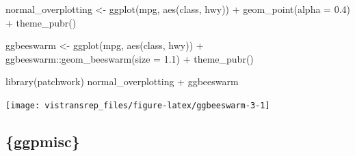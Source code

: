 \documentclass[]{book}
\newenvironment{Shaded}{}{}
\newcommand{\DataTypeTok}[1]{#1}
\newcommand{\FloatTok}[1]{#1}
\newcommand{\KeywordTok}[1]{\textcolor[rgb]{0.00,0.00,1.00}{#1}}
\newcommand{\NormalTok}[1]{#1}
\newcommand{\OperatorTok}[1]{#1}
\newcommand{\StringTok}[1]{\textcolor[rgb]{0.00,0.50,0.50}{#1}}
\begin{document}
\begin{Shaded}
\begin{Highlighting}[]
\NormalTok{normal_overplotting <-}\StringTok{ }\KeywordTok{ggplot}\NormalTok{(mpg, }\KeywordTok{aes}\NormalTok{(class, hwy)) }\OperatorTok{+}
\StringTok{  }\KeywordTok{geom_point}\NormalTok{(}\DataTypeTok{alpha =} \FloatTok{0.4}\NormalTok{) }\OperatorTok{+}
\StringTok{  }\KeywordTok{theme_pubr}\NormalTok{()}
\end{Highlighting}
\end{Shaded}

\begin{Shaded}
\begin{Highlighting}[]
\NormalTok{ggbeeswarm <-}\StringTok{ }\KeywordTok{ggplot}\NormalTok{(mpg, }\KeywordTok{aes}\NormalTok{(class, hwy)) }\OperatorTok{+}
\StringTok{  }\NormalTok{ggbeeswarm}\OperatorTok{::}\KeywordTok{geom_beeswarm}\NormalTok{(}\DataTypeTok{size =} \FloatTok{1.1}\NormalTok{) }\OperatorTok{+}
\StringTok{  }\KeywordTok{theme_pubr}\NormalTok{()}
\end{Highlighting}
\end{Shaded}

\begin{Shaded}
\begin{Highlighting}[]
\KeywordTok{library}\NormalTok{(patchwork)}
\NormalTok{normal_overplotting }\OperatorTok{+}\StringTok{ }\NormalTok{ggbeeswarm}
\end{Highlighting}
\end{Shaded}

\begin{flushright}\texttt{[image: vistransrep\_files/figure-latex/ggbeeswarm-3-1]} \end{flushright}

\hypertarget{ggpmisc}{%
\subsection{\{ggpmisc\}}\label{ggpmisc}}
\end{document}
